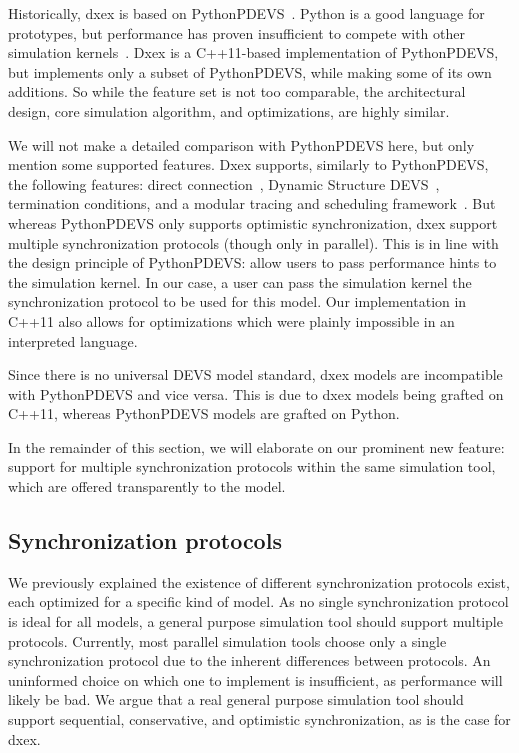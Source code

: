 Historically, dxex is based on PythonPDEVS~\cite{PythonPDEVS}.
Python is a good language for prototypes, but performance has proven insufficient to compete with other simulation kernels~\cite{MasterThesis}.
Dxex is a C++11-based implementation of PythonPDEVS, but implements only a subset of PythonPDEVS, while making some of its own additions.
So while the feature set is not too comparable, the architectural design, core simulation algorithm, and optimizations, are highly similar.

We will not make a detailed comparison with PythonPDEVS here, but only mention some supported features.
Dxex supports, similarly to PythonPDEVS, the following features: direct connection~\cite{SymbolicFlattening}, \textsf{Dynamic Structure DEVS}~\cite{DSDEVS}, termination conditions, and a modular tracing and scheduling framework~\cite{PythonPDEVS}.
But whereas PythonPDEVS only supports optimistic synchronization, dxex support multiple synchronization protocols (though only in parallel).
This is in line with the design principle of PythonPDEVS: allow users to pass performance hints to the simulation kernel.
In our case, a user can pass the simulation kernel the synchronization protocol to be used for this model.
Our implementation in C++11 also allows for optimizations which were plainly impossible in an interpreted language.

Since there is no universal \textsf{DEVS} model standard, dxex models are incompatible with PythonPDEVS and vice versa.
This is due to dxex models being grafted on C++11, whereas PythonPDEVS models are grafted on Python.

In the remainder of this section, we will elaborate on our prominent new feature: support for multiple synchronization protocols within the same simulation tool, which are offered transparently to the model.

\subsection{Synchronization protocols}
We previously explained the existence of different synchronization protocols exist, each optimized for a specific kind of model.
As no single synchronization protocol is ideal for all models, a general purpose simulation tool should support multiple protocols.
Currently, most parallel simulation tools choose only a single synchronization protocol due to the inherent differences between protocols.
An uninformed choice on which one to implement is insufficient, as performance will likely be bad.
We argue that a real general purpose simulation tool should support sequential, conservative, and optimistic synchronization, as is the case for dxex.

